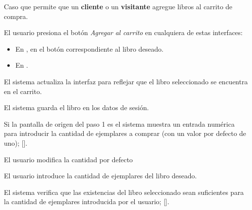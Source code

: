 %
%

{
  Caso que permite que un \textbf{cliente} o un \textbf{visitante} agregue
  libros al carrito de compra.

  \begin{trayectoriaPrincipal}

    \item El usuario presiona el botón \textit{Agregar al carrito} en
      cualquiera de estas interfaces:
      \begin{itemize}
        \item En , en el botón correspondiente
          al libro deseado.
        \item En .
      \end{itemize}

      \item El sistema actualiza la interfaz para reflejar que el libro
        seleccionado se encuentra en el carrito.

      \item El sistema guarda el libro en los datos de sesión.

      \item Si la pantalla de origen del paso 1 es
         el sistema muestra un entrada
        numérica para introducir la cantidad de ejemplares a comprar (con un
        valor por defecto de uno);
        [].

  \end{trayectoriaPrincipal}


  \begin{trayectoriaAlternativa}
    {El usuario modifica la cantidad por defecto}

    \item El usuario introduce la cantidad de ejemplares del
      libro deseado.

    \item El sistema verifica que las existencias del libro seleccionado
      sean suficientes para la cantidad de ejemplares introducida por el
      usuario; [].


\end{trayectoriaAlternativa}}
